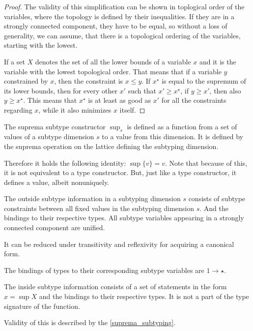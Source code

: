 \begin{proof}
The validity of this simplification can be shown in toplogical order of the variables, where the topology is defined by their inequalities. If they are in a strongly connected component, they have to be equal, so without a loss of generality, we can assume, that there is a topological ordering of the variables, starting with the lowest.

If a set $X$ denotes the set of all the lower bounds of a variable $x$ and it is the variable with the lowest topological order. That means that if a variable $y$ constrained by $x$, then the constraint is $x \leq y$. If $x^\star$ is equal to the supremum of its lower bounds, then for every other $x'$ such that $x' \geq x^\star$, if $y \geq x'$, then also $y \geq x^\star$. This means that $x^\star$ is at least as good as $x'$ for all the constraints regarding $x$, while it also minimizes $x$ itself.
\end{proof}

\begin{defn}
    The suprema subtype constructor $\sup_s$ is defined as a function from a set of values of a subtype dimension $s$ to a value from this dimension. It is defined by the suprema operation on the lattice defining the subtyping dimension.

    Therefore it holds the following identity: $\sup \{v\} = v$. Note that because of this, it is not equivalent to a type constructor. But, just like a type constructor, it defines a value, albeit nonuniquely.
\end{defn}

\begin{defn}
    The outside subtype information in a subtyping dimension $s$ consists of subtype constraints between all fixed values in the subtyping dimension $s$. And the bindings to their respective types. All subtype variables appearing in a strongly connected component are unified.

    It can be reduced under transitivity and reflexivity for acquiring a canonical form.
\end{defn}

\begin{remark}
    The bindings of types to their corresponding subtype variables are $1 \to \star$.
\end{remark}

\begin{defn}
    The inside subtype information consists of a set of statements in the form $x = \sup X$ and the bindings to their respective types. It is not a part of the type signature of the function.

    Validity of this is described by the \cref{suprema_subtyping}.
\end{defn}

